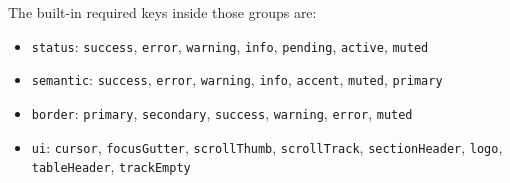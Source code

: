 The built-in required keys inside those groups are:

\begin{itemize}
\tightlist
\item
  \texttt{s\allowbreak{}t\allowbreak{}a\allowbreak{}t\allowbreak{}u\allowbreak{}s}: \texttt{s\allowbreak{}u\allowbreak{}c\allowbreak{}c\allowbreak{}e\allowbreak{}s\allowbreak{}s}, \texttt{e\allowbreak{}r\allowbreak{}r\allowbreak{}o\allowbreak{}r}, \texttt{w\allowbreak{}a\allowbreak{}r\allowbreak{}n\allowbreak{}i\allowbreak{}n\allowbreak{}g}, \texttt{i\allowbreak{}n\allowbreak{}f\allowbreak{}o}, \texttt{p\allowbreak{}e\allowbreak{}n\allowbreak{}d\allowbreak{}i\allowbreak{}n\allowbreak{}g}, \texttt{a\allowbreak{}c\allowbreak{}t\allowbreak{}i\allowbreak{}v\allowbreak{}e}, \texttt{m\allowbreak{}u\allowbreak{}t\allowbreak{}e\allowbreak{}d}
\item
  \texttt{s\allowbreak{}e\allowbreak{}m\allowbreak{}a\allowbreak{}n\allowbreak{}t\allowbreak{}i\allowbreak{}c}: \texttt{s\allowbreak{}u\allowbreak{}c\allowbreak{}c\allowbreak{}e\allowbreak{}s\allowbreak{}s}, \texttt{e\allowbreak{}r\allowbreak{}r\allowbreak{}o\allowbreak{}r}, \texttt{w\allowbreak{}a\allowbreak{}r\allowbreak{}n\allowbreak{}i\allowbreak{}n\allowbreak{}g}, \texttt{i\allowbreak{}n\allowbreak{}f\allowbreak{}o}, \texttt{a\allowbreak{}c\allowbreak{}c\allowbreak{}e\allowbreak{}n\allowbreak{}t}, \texttt{m\allowbreak{}u\allowbreak{}t\allowbreak{}e\allowbreak{}d}, \texttt{p\allowbreak{}r\allowbreak{}i\allowbreak{}m\allowbreak{}a\allowbreak{}r\allowbreak{}y}
\item
  \texttt{b\allowbreak{}o\allowbreak{}r\allowbreak{}d\allowbreak{}e\allowbreak{}r}: \texttt{p\allowbreak{}r\allowbreak{}i\allowbreak{}m\allowbreak{}a\allowbreak{}r\allowbreak{}y}, \texttt{s\allowbreak{}e\allowbreak{}c\allowbreak{}o\allowbreak{}n\allowbreak{}d\allowbreak{}a\allowbreak{}r\allowbreak{}y}, \texttt{s\allowbreak{}u\allowbreak{}c\allowbreak{}c\allowbreak{}e\allowbreak{}s\allowbreak{}s}, \texttt{w\allowbreak{}a\allowbreak{}r\allowbreak{}n\allowbreak{}i\allowbreak{}n\allowbreak{}g}, \texttt{e\allowbreak{}r\allowbreak{}r\allowbreak{}o\allowbreak{}r}, \texttt{m\allowbreak{}u\allowbreak{}t\allowbreak{}e\allowbreak{}d}
\item
  \texttt{u\allowbreak{}i}: \texttt{c\allowbreak{}u\allowbreak{}r\allowbreak{}s\allowbreak{}o\allowbreak{}r}, \texttt{f\allowbreak{}o\allowbreak{}c\allowbreak{}u\allowbreak{}s\allowbreak{}G\allowbreak{}u\allowbreak{}t\allowbreak{}t\allowbreak{}e\allowbreak{}r}, \texttt{s\allowbreak{}c\allowbreak{}r\allowbreak{}o\allowbreak{}l\allowbreak{}l\allowbreak{}T\allowbreak{}h\allowbreak{}u\allowbreak{}m\allowbreak{}b}, \texttt{s\allowbreak{}c\allowbreak{}r\allowbreak{}o\allowbreak{}l\allowbreak{}l\allowbreak{}T\allowbreak{}r\allowbreak{}a\allowbreak{}c\allowbreak{}k}, \texttt{s\allowbreak{}e\allowbreak{}c\allowbreak{}t\allowbreak{}i\allowbreak{}o\allowbreak{}n\allowbreak{}H\allowbreak{}e\allowbreak{}a\allowbreak{}d\allowbreak{}e\allowbreak{}r}, \texttt{l\allowbreak{}o\allowbreak{}g\allowbreak{}o}, \texttt{t\allowbreak{}a\allowbreak{}b\allowbreak{}l\allowbreak{}e\allowbreak{}H\allowbreak{}e\allowbreak{}a\allowbreak{}d\allowbreak{}e\allowbreak{}r}, \texttt{t\allowbreak{}r\allowbreak{}a\allowbreak{}c\allowbreak{}k\allowbreak{}E\allowbreak{}m\allowbreak{}p\allowbreak{}t\allowbreak{}y}

\end{itemize}
